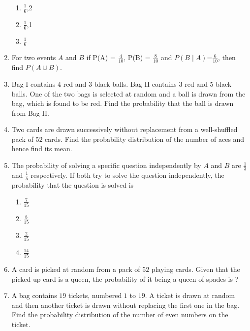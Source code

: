 \begin{enumerate}[label=\thesection.\arabic*.,ref=\thesection.\theenumi]
\begin{enumerate}[label=(\alph*)]
 \item  $\frac{1}{6}$,2

 \item  $\frac{1}{6}$,1

 \item  $\frac{1}{6}$

\end{enumerate}


\item For two events $A$ and $B$ if P(A) = $\frac{4}{10}$, P(B) = $\frac{8}{10}$ and 
$ P(B \mid A)$=$\frac{6}{10}$, then find $ P(A \cup B)$.

\item Bag I contains $4$ red and $3$ black balls. Bag II contains $3$ red 
and $5$ black balls. One of the two bags is selected at random 
and a ball is drawn from the bag, which is found to be red. 
Find the probability that the ball is drawn from Bag II.

\item Two cards are drawn successively without replacement from a 
well-shuffled pack of $52$ cards. Find the probability 
distribution of the number of aces and hence find its mean.
\newpage

\item The probability of solving a specific question independently by $A$ and $B$ 
are $\frac{1}{3}$ and $\frac{1}{5}$ respectively. If both try to solve the question independently, 
the probability that the question is solved is 

\begin{enumerate}[label=(\alph*)]
    
 \item  $\frac{7}{15}$
 
 \item  $\frac{8}{15}$
 
 \item  $\frac{2}{15}$
 
 \item  $\frac{14}{15}$

\end{enumerate}

\item A card is picked at random from a pack of $52$ playing cards. Given that 
the picked up card is a queen, the probability of it being a queen of 
spades is ?

\item A bag contains $19$ tickets, numbered $1$ to $19$. A ticket is drawn at random 
and then another ticket is drawn without replacing the first one in the 
bag. Find the probability distribution of the number of even numbers on 
the ticket.


\end{enumerate}
